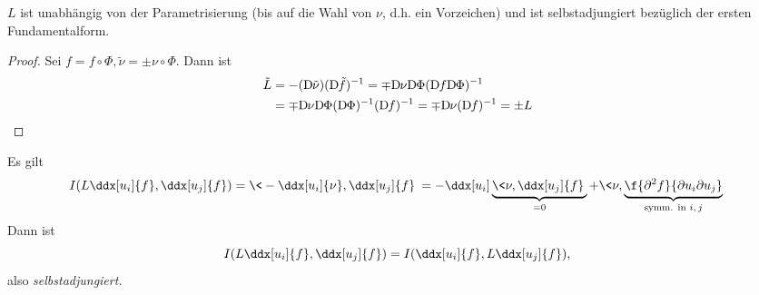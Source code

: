 \begin{lem}
	$L$ ist unabhängig von der Parametrisierung (bis auf die Wahl von $\nu$, d.h. ein Vorzeichen) und ist selbstadjungiert bezüglich der ersten Fundamentalform.
	\begin{proof}
		Sei $f = f \circ \Phi, \tilde \nu = \pm \nu \circ \Phi$.
		Dann ist
		\begin{align*}
			\tilde L
			&= -(\Df[\tilde \nu]) (\Df[\tilde f])^{-1}
			= \mp \Df[\nu] \Df[\Phi] (\Df \Df[\Phi])^{-1} \\
			&= \mp \Df[\nu] \Df[\Phi] (\Df[\Phi])^{-1} (\Df)^{-1}
			= \mp \Df[\nu] (\Df)^{-1}
			= \pm L
		\end{align*}
	\end{proof}
	Es gilt
	\[
		I(L \ddx[u_i]{f}, \ddx[u_j]{f})
		= \< - \ddx[u_i]{\nu}, \ddx[u_j]{f} \>
		= - \ddx[u_i]\underbrace{\<\nu, \ddx[u_j]{f}\>}_{=0} + \<\nu, \underbrace{\f{\partial^2 f}{\partial u_i \partial u_j}}_{\text{symm. in $i,j$}} \>
	\]
	Dann ist
	\[
		I(L \ddx[u_i]{f}, \ddx[u_j]{f})
		= I(\ddx[u_i]{f}, L \ddx[u_j]{f}),
	\]
	also \emph{selbstadjungiert.}
\end{lem}









